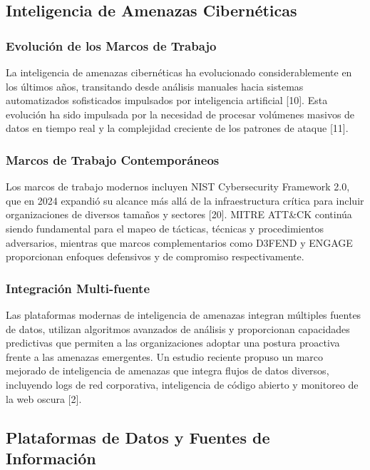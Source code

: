 \subsection{Inteligencia de Amenazas Cibernéticas}

\subsubsection{Evolución de los Marcos de Trabajo}

La inteligencia de amenazas cibernéticas ha evolucionado considerablemente en los últimos años, transitando desde análisis manuales hacia sistemas automatizados sofisticados impulsados por inteligencia artificial [10]. Esta evolución ha sido impulsada por la necesidad de procesar volúmenes masivos de datos en tiempo real y la complejidad creciente de los patrones de ataque [11].

\subsubsection{Marcos de Trabajo Contemporáneos}

Los marcos de trabajo modernos incluyen NIST Cybersecurity Framework 2.0, que en 2024 expandió su alcance más allá de la infraestructura crítica para incluir organizaciones de diversos tamaños y sectores [20]. MITRE ATT\&CK continúa siendo fundamental para el mapeo de tácticas, técnicas y procedimientos adversarios, mientras que marcos complementarios como D3FEND y ENGAGE proporcionan enfoques defensivos y de compromiso respectivamente.

\subsubsection{Integración Multi-fuente}

Las plataformas modernas de inteligencia de amenazas integran múltiples fuentes de datos, utilizan algoritmos avanzados de análisis y proporcionan capacidades predictivas que permiten a las organizaciones adoptar una postura proactiva frente a las amenazas emergentes. Un estudio reciente propuso un marco mejorado de inteligencia de amenazas que integra flujos de datos diversos, incluyendo logs de red corporativa, inteligencia de código abierto y monitoreo de la web oscura [2].

\subsection{Plataformas de Datos y Fuentes de Información}

